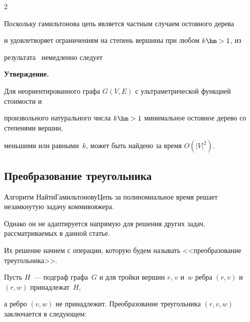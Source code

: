 \begin{multicols}{2}
{}













Поскольку гамильтонова цепь является частным случаем остовного дерева


и удовлетворяет ограничениям на степень вершины при любом $k\hm>1$, из


результата~\cite{Gusfield} немедленно следует





\smallskip





\noindent


\textbf{Утверждение.}


Для неориентированного графа $G(V,E)$ с ультраметрической функцией стоимости и


произвольного натурального числа $k\hm>1$ минимальное остовное дерево со степенями вершин,


меньшими или равными~$k$, может быть найдено за время $O(|V|^2)$.





\subsection{Преобразование треугольника}


Алгоритм {\sf НайтиГамильтоновуЦепь} за полиномиальное время решает незамкнутую задачу коммивояжера.


Однако он не адаптируется напрямую для решения других задач, рассматриваемых в данной статье.


Их решение начнем с операции, которую будем называть <<преобразование треугольника>>.





Пусть $H$~--- подграф графа~$G$ и для тройки вершин $r$, $v$ и~$w$ ребра $(r,v)$ и $(r,w)$ принадлежат~$H$,


а ребро $(v,w)$ не принадлежит. Преобразование треугольника $(r,v,w)$ заключается в следующем:





\medskip






\end{multicols}
